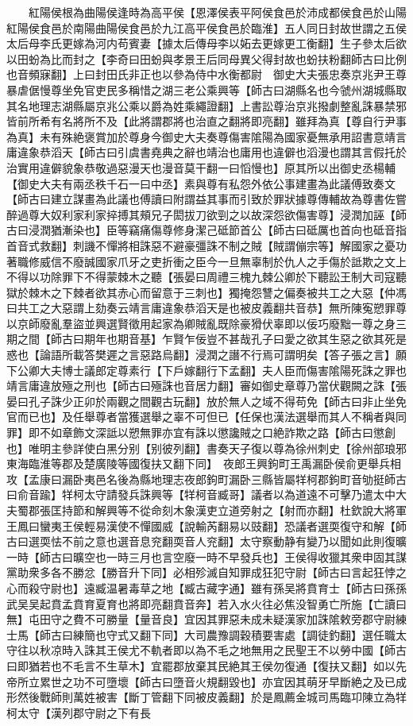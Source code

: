 　　紅陽侯根為曲陽侯逢時為高平侯【恩澤侯表平阿侯食邑於沛成都侯食邑於山陽紅陽侯食邑於南陽曲陽侯食邑於九江高平侯食邑於臨淮】五人同日封故世謂之五侯太后母李氏更嫁為河内苟賓妻【據太后傳母李以妬去更嫁更工衡翻】生子參太后欲以田蚡為比而封之【李奇曰田蚡與孝景王后同母異父得封故也蚡扶粉翻師古曰比例也音頻寐翻】上曰封田氏非正也以參為侍中水衡都尉　御史大夫張忠奏京兆尹王尊暴虐倨慢尊坐免官吏民多稱惜之湖三老公乘興等【師古曰湖縣名也今虢州湖城縣取其名地理志湖縣屬京兆公乘以爵為姓乘繩證翻】上書訟尊治京兆撥劇整亂誅暴禁邪皆前所希有名將所不及【此將謂郡將也治直之翻將即亮翻】雖拜為真【尊自行尹事為真】未有殊絶褒賞加於尊身今御史大夫奏尊傷害隂陽為國家憂無承用詔書意靖言庸違象恭滔天【師古曰引虞書堯典之辭也靖治也庸用也違僻也滔漫也謂其言假托於治實用違僻貌象恭敬過惡漫天也漫音莫干翻一曰慆慢也】原其所以出御史丞楊輔【御史大夫有兩丞秩千石一曰中丞】素與尊有私怨外依公事建畫為此議傅致奏文【師古曰建立謀畫為此議也傅讀曰附謂益其事而引致於罪狀據尊傳輔故為尊書佐嘗醉過尊大奴利家利家捽搏其頰兄子閎拔刀欲剄之以故深怨欲傷害尊】浸潤加誣【師古曰浸潤猶漸染也】臣等竊痛傷尊修身潔己砥節首公【師古曰砥厲也首向也砥音指首音式救翻】刺譏不憚將相誅惡不避豪彊誅不制之賊【賊謂傰宗等】解國家之憂功著職修威信不廢誠國家爪牙之吏折衝之臣今一旦無辜制於仇人之手傷於詆欺之文上不得以功除罪下不得蒙棘木之聽【張晏曰周禮三槐九棘公卿於下聽訟王制大司寇聽獄於棘木之下棘者欲其赤心而留意于三刺也】獨掩怨讐之偏奏被共工之大惡【仲馮曰共工之大惡謂上劾奏云靖言庸違象恭滔天是也被皮義翻共音恭】無所陳寃愬罪尊以京師廢亂羣盜並興選賢徵用起家為卿賊亂既除豪猾伏辜即以佞巧廢黜一尊之身三期之間【師古曰期年也期音基】乍賢乍佞豈不甚哉孔子曰愛之欲其生惡之欲其死是惑也【論語所載答樊遲之言惡路烏翻】浸潤之譖不行焉可謂明矣【答子張之言】願下公卿大夫博士議郎定尊素行【下戶嫁翻行下孟翻】夫人臣而傷害隂陽死誅之罪也靖言庸違放殛之刑也【師古曰殛誅也音居力翻】審如御史章尊乃當伏觀闕之誅【張晏曰孔子誅少正卯於兩觀之間觀古玩翻】放於無人之域不得苟免【師古曰非止坐免官而已也】及任舉尊者當獲選舉之辜不可但已【任保也漢法選舉而其人不稱者與同罪】即不如章飾文深詆以愬無罪亦宜有誅以懲讒賊之口絶詐欺之路【師古曰懲創也】唯明主參詳使白黑分别【别彼列翻】書奏天子復以尊為徐州刺史【徐州部琅邪東海臨淮等郡及楚廣陵等國復扶又翻下同】　夜郎王興鉤町王禹漏卧侯俞更舉兵相攻【孟康曰漏卧夷邑名後為縣地理志夜郎鉤町漏卧三縣皆屬䍧柯郡鉤町音劬挺師古曰俞音踰】䍧柯太守請發兵誅興等【䍧柯音臧哥】議者以為道遠不可擊乃遣太中大夫蜀郡張匡持節和解興等不從命刻木象漢吏立道旁射之【射而亦翻】杜欽說大將軍王鳳曰蠻夷王侯輕易漢使不憚國威【說輸芮翻易以豉翻】恐議者選耎復守和解【師古曰選耎怯不前之意也選音息兖翻耎音人兖翻】太守察動静有變乃以聞如此則復曠一時【師古曰曠空也一時三月也言空廢一時不早發兵也】王侯得收獵其衆申固其謀黨助衆多各不勝忿【勝音升下同】必相殄滅自知罪成狂犯守尉【師古曰言起狂悖之心而殺守尉也】遠臧温暑毒草之地【臧古藏字通】雖有孫吴將賁育士【師古曰孫孫武吴吴起賁孟賁育夏育也將即亮翻賁音奔】若入水火往必焦没智勇亡所施【亡讀曰無】屯田守之費不可勝量【量音良】宜因其罪惡未成未疑漢家加誅隂敕旁郡守尉練士馬【師古曰練簡也守式又翻下同】大司農豫調穀積要害處【調徒釣翻】選任職太守往以秋凉時入誅其王侯尤不軌者即以為不毛之地無用之民聖王不以勞中國【師古曰即猶若也不毛言不生草木】宜罷郡放棄其民絶其王侯勿復通【復扶又翻】如以先帝所立累世之功不可墮壞【師古曰墮音火規翻毀也】亦宜因其萌牙早斷絶之及已成形然後戰師則萬姓被害【斷丁管翻下同被皮義翻】於是鳳薦金城司馬臨卭陳立為䍧柯太守【漢列郡守尉之下有長